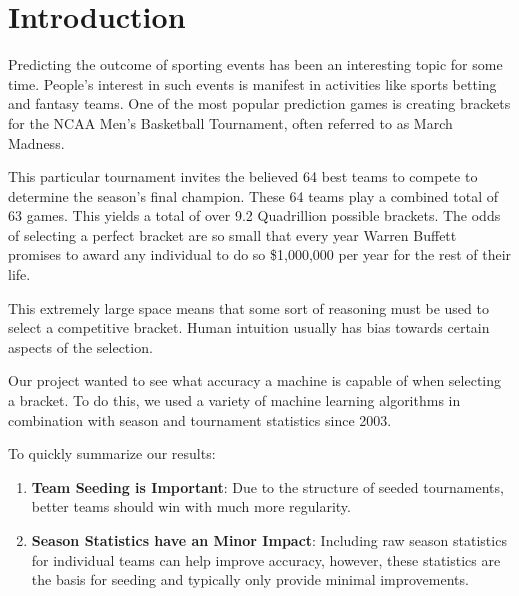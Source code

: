 \section{Introduction}

Predicting the outcome of sporting events has been an interesting topic for some time.
People's interest in such events is manifest in activities like sports betting and fantasy teams.
One of the most popular prediction games is creating brackets for the NCAA Men's Basketball Tournament, often referred to as March Madness.

This particular tournament invites the believed 64 best teams to compete to determine the season's final champion.
These 64 teams play a combined total of 63 games.
This yields a total of over 9.2 Quadrillion possible brackets.
The odds of selecting a perfect bracket are so small that every year Warren Buffett promises to award any individual to do so \$1,000,000 per year for the rest of their life.

This extremely large space means that some sort of reasoning must be used to select a competitive bracket.
Human intuition usually has bias towards certain aspects of the selection.

Our project wanted to see what accuracy a machine is capable of when selecting a bracket.
To do this, we used a variety  of machine learning algorithms in combination with season and tournament statistics since 2003.

To quickly summarize our results:
\begin{enumerate}
	\item \textbf{Team Seeding is Important}: Due to the structure of seeded tournaments, better teams should win with much more regularity.
	\item \textbf{Season Statistics have an Minor Impact}: Including raw season statistics for individual teams can help improve accuracy, however, these statistics are the basis for seeding and typically only provide minimal improvements.
\end{enumerate}